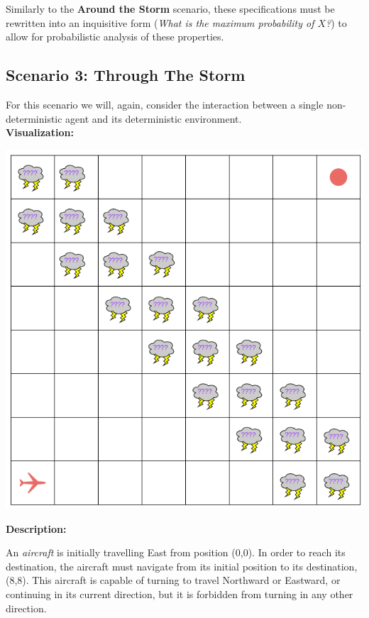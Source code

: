 \documentclass{article}
\begin{document}
Similarly to the \textbf{Around the Storm} scenario, these specifications must be rewritten into an inquisitive form (\textit{What is the maximum probability of $X$?}) to allow for probabilistic analysis of these properties.

\subsection*{Scenario 3: Through The Storm}

For this scenario we will, again, consider the interaction between a single non-deterministic agent and its deterministic environment. \\

\textbf{Visualization:}

\begin{center}
    \includegraphics[scale=.4]{figs/through_the_storm.png}
\end{center}

\textbf{Description:}

An \textit{aircraft} is initially travelling East from position (0,0). In order to reach its destination, the aircraft must navigate from its initial position to its destination, (8,8). This aircraft is capable of turning to travel Northward or Eastward, or continuing in its current direction, but it is forbidden from turning in any other direction. \\
\end{document}

